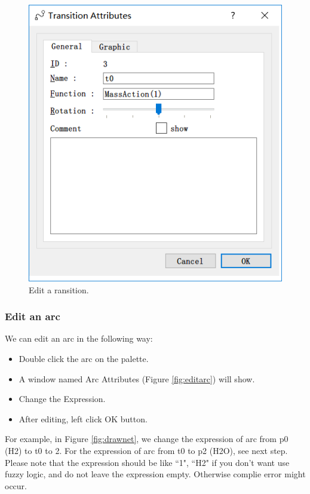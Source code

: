 \documentclass[journal,a4paper,onecolumn]{article}
\begin{document}
\begin{figure}[!hbt]
	\begin{center}
		\includegraphics[width=\columnwidth]{fig4}
		\caption{Edit a ransition.}
		\label{fig:edittransition}
	\end{center}
\end{figure}



\subsubsection{Edit an arc}
We can edit an arc in the following way:
\begin{itemize}
	\item Double click the arc on the palette.
	\item A window named Arc Attributes (Figure \ref{fig:editarc}) will show.
	\item Change the Expression.
	\item After editing, left click OK button.
\end{itemize}

For example, in Figure \ref{fig:drawnet}, we change the expression of arc from p0 (H2) to t0 to 2. For the expression of arc from t0 to p2 (H2O), see next step. Please note that the expression should be like ``1", ``H2" if you don't want use fuzzy logic, and do not leave the expression empty. Otherwise complie error might occur. 
\end{document}
